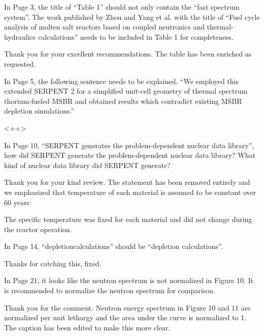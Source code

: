 \documentclass[answers,11pt]{exam}
\begin{document}
\begin{questions}
        \question  In Page 3, the title of ``Table 1'' should not only contain 
        the ``fast spectrum system''. The work published by Zhou and Yang et al. 
        with the title of ``Fuel cycle analysis of molten salt reactors based on 
        coupled neutronics and thermal-hydraulics calculations'' needs to be 
        included in Table 1 for completeness.
        \begin{solution}
                Thank you for your excellent recommendations. The table has been 
                enriched as requested.
        \end{solution}

        \question  In Page 5, the following sentence needs to be explained. ``We 
        employed this extended SERPENT 2 for a simplified unit-cell geometry of 
        thermal spectrum thorium-fueled MSBR and obtained results which 
        contradict existing MSBR depletion simulations.''
        \begin{solution}
                <++>
        \end{solution}

        \question  In Page 10, ``SERPENT generates the problem-dependent nuclear 
        data library'', how did SERPENT generate the problem-dependent nuclear 
        data library? What kind of nuclear data library did SERPENT generate?
        \begin{solution}
                Thank you for your kind review. The statement has been removed
		        entirely and we emphasized that temperature of each material is 
		        assumed to be constant over 60 years:
		        
		        The specific temperature was fixed for each material and did 
		        not change during the reactor operation. 
        \end{solution}

        \question  In Page 14, ``depletioncalculations'' should be ``depletion 
        calculations''.
        \begin{solution}
                Thanks for catching this, fixed.
        \end{solution}

        \question  In Page 21, it looks like the neutron spectrum is not 
        normalized in Figure 10. It is recommended to normalize the neutron 
        spectrum for comparison.
        \begin{solution}
                Thank you for the comment. Neutron energy spectrum in Figure 
                10 and 11 are normalized per unit lethargy and the area under 
                the curve is normalized to 1. The caption has been edited to 
                make this more clear.
        \end{solution}


\end{questions}
\end{document}
